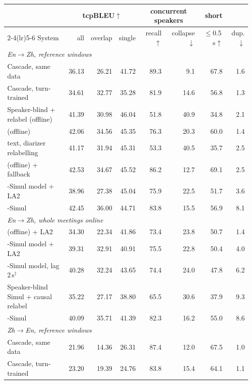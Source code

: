 \begin{table}[t]
\centering\small
\setlength{\tabcolsep}{4pt}
\begin{tabular}{lrrrrrrr}
\toprule
 & \multicolumn{3}{c}{tcpBLEU$\uparrow$} & \multicolumn{2}{c}{concurrent speakers} & short & \\
\cmidrule(lr){2-4}\cmidrule(lr){5-6}
System & all & overlap & single & recall$\uparrow$ & collapse$\downarrow$ & $\le$0.5\,s$\uparrow$ & dup.$\downarrow$ \\
\midrule
\multicolumn{8}{l}{\emph{En$\rightarrow$Zh, reference windows}} \\
Cascade, same data & 36.13 & 26.21 & 41.72 & 89.3 & 9.1 & 67.8 & 1.6 \\
Cascade, turn-trained & 34.61 & 32.77 & 35.28 & 81.9 & 14.6 & 56.8 & 1.3 \\
Speaker-blind + relabel (offline) & 41.39 & 30.98 & 46.04 & 51.8 & 40.9 & 34.8 & 2.1 \\
\sys{} (offline) & 42.06 & 34.56 & 45.35 & 76.3 & 20.3 & 60.0 & 1.4 \\
\sys{} text, diarizer relabelling & 41.17 & 31.94 & 45.31 & 53.3 & 40.5 & 35.7 & 2.5 \\
\sys{} (offline) + fallback & 42.53 & 34.67 & 45.52 & 86.2 & 12.7 & 69.1 & 2.5 \\
\sys{}-Simul model + LA2 & 38.96 & 27.38 & 45.04 & 75.9 & 22.5 & 51.7 & 3.6 \\
\sys{}-Simul & 42.45 & 36.00 & 44.71 & 83.8 & 15.5 & 56.9 & 8.1 \\
\multicolumn{8}{l}{\emph{En$\rightarrow$Zh, whole meetings online}} \\
\sys{} (offline) + LA2 & 34.30 & 22.34 & 41.86 & 73.4 & 23.8 & 50.7 & 1.4 \\
\sys{}-Simul model + LA2 & 39.31 & 32.91 & 40.91 & 75.5 & 22.8 & 50.4 & 4.0 \\
\sys{}-Simul model, lag 2\,s$^\dagger$ & 40.28 & 32.24 & 43.65 & 74.4 & 24.0 & 47.8 & 6.2 \\
Speaker-blind Simul + causal relabel & 35.22 & 27.17 & 38.80 & 65.5 & 30.6 & 37.9 & 9.3 \\
\sys{}-Simul & 40.09 & 35.71 & 41.39 & 82.3 & 16.2 & 55.0 & 8.6 \\
\multicolumn{8}{l}{\emph{Zh$\rightarrow$En, reference windows}} \\
Cascade, same data & 21.96 & 14.36 & 26.31 & 87.4 & 12.0 & 67.5 & 1.0 \\
Cascade, turn-trained & 23.20 & 19.39 & 24.76 & 83.8 & 15.4 & 64.1 & 1.1 \\

\end{tabular}
\end{table}
